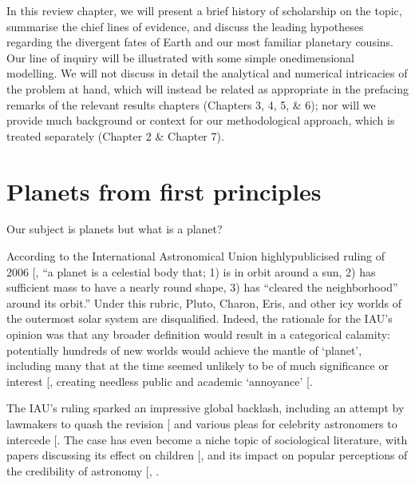 \documentclass[letterpaper,10pt,english]{jupyterBook}
\begin{document}
\sphinxAtStartPar
In this review chapter, we will present a brief history of scholarship on the topic, summarise the chief lines of evidence, and discuss the leading hypotheses regarding the divergent fates of Earth and our most familiar planetary cousins. Our line of inquiry will be illustrated with some simple one\sphinxhyphen{}dimensional modelling. We will not discuss in detail the analytical and numerical intricacies of the problem at hand, which will instead be related as appropriate in the prefacing remarks of the relevant results chapters (Chapters 3, 4, 5, \& 6); nor will we provide much background or context for our methodological approach, which is treated separately (Chapter 2 \& Chapter 7).


\section{Planets from first principles}
\label{\detokenize{content/chapter_01_background/main:planets-from-first-principles}}
\sphinxAtStartPar
Our subject is planets \sphinxhyphen{} but what is a planet?

\sphinxAtStartPar
According to the International Astronomical Union highly\sphinxhyphen{}publicised ruling of 2006 {[}\sphinxcite{references:id472}{]}, “a planet is a celestial body that; 1) is in orbit around a sun, 2) has sufficient mass to have a nearly round shape, 3) has “cleared the neighborhood” around its orbit.” Under this rubric, Pluto, Charon, Eris, and other icy worlds of the outermost solar system are disqualified. Indeed, the rationale for the IAU’s opinion was that any broader definition would result in a categorical calamity: potentially hundreds of new worlds would achieve the mantle of ‘planet’, including many that at the time seemed unlikely to be of much significance or interest {[}\sphinxcite{references:id126}{]}, creating needless public and academic ‘annoyance’ {[}\sphinxcite{references:id118}{]}.

\sphinxAtStartPar
The IAU’s ruling sparked an impressive global backlash, including an attempt by lawmakers to quash the revision {[}\sphinxcite{references:id124}{]} and various pleas for celebrity astronomers to intercede {[}\sphinxcite{references:id123}{]}. The case has even become a niche topic of sociological literature, with papers discussing its effect on children {[}, \sphinxcite{references:id128}{]} and its impact on popular perceptions of the credibility of astronomy {[}, \sphinxcite{references:id131}{]}.
\end{document}
